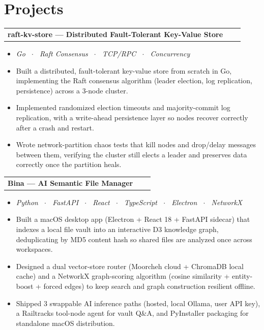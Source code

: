 \documentclass[a4paper,10.5pt]{article}
\makeatletter
\newenvironment{project}[3]
    {
    \begin{tabularx}{\linewidth}{@{}l X r@{}}
    \textbf{#1} & \hfill & \href{#2}{\faGithub} \\[0.5pt]
    \end{tabularx}
    \begin{minipage}[t]{\linewidth}
    \begin{itemize}[nosep,after=\strut, leftmargin=1em, itemsep=0.5pt,label=--]
    }
    {
    \end{itemize}
    \end{minipage}
    }
\makeatother
\begin{document}

\section{Projects}

\begin{project}{raft-kv-store --- Distributed Fault-Tolerant Key-Value Store}{https://github.com/erfansaffari/raft-kv-store}{raft-kv-store}
    \item[] \textit{\small Go \ $\cdot$ \ Raft Consensus \ $\cdot$ \ TCP/RPC \ $\cdot$ \ Concurrency} \\[-8pt]
    \item Built a distributed, fault-tolerant key-value store from scratch in Go, implementing the Raft consensus algorithm (leader election, log replication, persistence) across a 3-node cluster.
    \item Implemented randomized election timeouts and majority-commit log replication, with a write-ahead persistence layer so nodes recover correctly after a crash and restart.
    \item Wrote network-partition chaos tests that kill nodes and drop/delay messages between them, verifying the cluster still elects a leader and preserves data correctly once the partition heals.
\end{project}

\begin{project}{Bina --- AI Semantic File Manager}{https://github.com/erfansaffari/bina}{bina}
    \item[] \textit{\small Python \ $\cdot$ \ FastAPI \ $\cdot$ \ React \ $\cdot$ \ TypeScript \ $\cdot$ \ Electron \ $\cdot$ \ NetworkX} \\[-8pt]
    \item Built a macOS desktop app (Electron + React 18 + FastAPI sidecar) that indexes a local file vault into an interactive D3 knowledge graph, deduplicating by MD5 content hash so shared files are analyzed once across workspaces.
    \item Designed a dual vector-store router (Moorcheh cloud + ChromaDB local cache) and a NetworkX graph-scoring algorithm (cosine similarity + entity-boost + forced edges) to keep search and graph construction resilient offline.
    \item Shipped 3 swappable AI inference paths (hosted, local Ollama, user API key), a Railtracks tool-node agent for vault Q\&A, and PyInstaller packaging for standalone macOS distribution.
\end{project}
\end{document}

